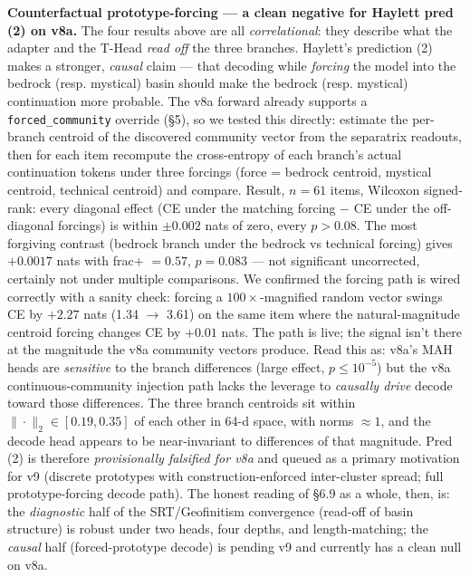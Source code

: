 \documentclass[
  11pt]{article}
\begin{document}
\textbf{Counterfactual prototype-forcing --- a clean negative for
Haylett pred (2) on v8a.} The four results above are all
\emph{correlational}: they describe what the adapter and the T-Head
\emph{read off} the three branches. Haylett's prediction (2) makes a
stronger, \emph{causal} claim --- that decoding while \emph{forcing} the
model into the bedrock (resp. mystical) basin should make the bedrock
(resp. mystical) continuation more probable. The v8a forward already
supports a \texttt{forced\_community} override (§5), so we tested this
directly: estimate the per-branch centroid of the discovered community
vector from the separatrix readouts, then for each item recompute the
cross-entropy of each branch's actual continuation tokens under three
forcings (force = bedrock centroid, mystical centroid, technical
centroid) and compare. Result, \(n = 61\) items, Wilcoxon signed-rank:
every diagonal effect (CE under the matching forcing \(-\) CE under the
off-diagonal forcings) is within \(\pm 0.002\) nats of zero, every
\(p > 0.08\). The most forgiving contrast (bedrock branch under the
bedrock vs technical forcing) gives \(+0.0017\) nats with frac+
\(= 0.57\), \(p = 0.083\) --- not significant uncorrected, certainly not
under multiple comparisons. We confirmed the forcing path is wired
correctly with a sanity check: forcing a \(100\times\)-magnified random
vector swings CE by \(+2.27\) nats (1.34 \(\to\) 3.61) on the same item
where the natural-magnitude centroid forcing changes CE by \(+0.01\)
nats. The path is live; the signal isn't there at the magnitude the v8a
community vectors produce. Read this as: v8a's MAH heads are
\emph{sensitive} to the branch differences (large effect,
\(p \le 10^{-5}\)) but the v8a continuous-community injection path lacks
the leverage to \emph{causally drive} decode toward those differences.
The three branch centroids sit within \(\|\cdot\|_2 \in [0.19, 0.35]\)
of each other in 64-d space, with norms \(\approx 1\), and the decode
head appears to be near-invariant to differences of that magnitude. Pred
(2) is therefore \emph{provisionally falsified for v8a} and queued as a
primary motivation for v9 (discrete prototypes with
construction-enforced inter-cluster spread; full prototype-forcing
decode path). The honest reading of §6.9 as a whole, then, is: the
\emph{diagnostic} half of the SRT/Geofinitism convergence (read-off of
basin structure) is robust under two heads, four depths, and
length-matching; the \emph{causal} half (forced-prototype decode) is
pending v9 and currently has a clean null on v8a.
\end{document}
